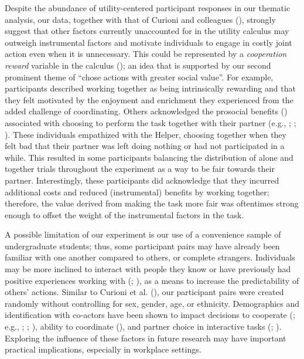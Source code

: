 \documentclass[
  man,
  floatsintext,
  longtable,
  nolmodern,
  notxfonts,
  notimes,
  colorlinks=true,linkcolor=blue,citecolor=blue,urlcolor=blue]{apa7}
\begin{document}
Despite the abundance of utility-centered participant responses in our
thematic analysis, our data, together with that of Curioni and
colleagues (), strongly suggest that
other factors currently unaccounted for in the utility calculus may
outweigh instrumental factors and motivate individuals to engage in
costly joint action even when it is unnecessary. This could be
represented by a \emph{cooperation reward} variable in the calculus
(); an idea that is
supported by our second prominent theme of ``chose actions with greater
social value''. For example, participants described working together as
being intrinsically rewarding and that they felt motivated by the
enjoyment and enrichment they experienced from the added challenge of
coordinating. Others acknowledged the prosocial benefits
() associated with
choosing to perform the task together with their partner (e.g.,
;
;
). These
individuals empathized with the Helper, choosing together when they felt
bad that their partner was left doing nothing or had not participated in
a while. This resulted in some participants balancing the distribution
of alone and together trials throughout the experiment as a way to be
fair towards their partner. Interestingly, these participants did
acknowledge that they incurred additional costs and reduced
(instrumental) benefits by working together; therefore, the value
derived from making the task more fair was oftentimes strong enough to
offset the weight of the instrumental factors in the task.

A possible limitation of our experiment is our use of a convenience
sample of undergraduate students; thus, some participant pairs may have
already been familiar with one another compared to others, or complete
strangers. Individuals may be more inclined to interact with people they
know or have previously had positive experiences working with
(;
), as a means to
increase the predictability of others' actions. Similar to Curioni et
al. (), our participant pairs were
created randomly without controlling for sex, gender, age, or ethnicity.
Demographics and identification with co-actors have been shown to impact
decisions to cooperate (;
e.g., ;
;
), ability to coordinate
(), and partner
choice in interactive tasks (; ). Exploring
the influence of these factors in future research may have important
practical implications, especially in workplace settings.
\end{document}
